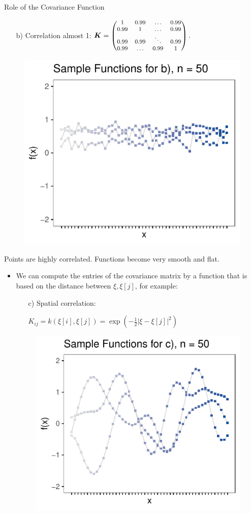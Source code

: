 \documentclass[11pt,compress,t,notes=noshow, xcolor=table]{beamer}
\begin{document}
\begin{vbframe}{Role of the Covariance Function}

\begin{enumerate}
  \item[b)] Correlation almost 1: $\bm{K} = \begin{footnotesize}\begin{pmatrix} 1 & 0.99 & \dots & 0.99 \\
  0.99 & 1 & \dots & 0.99 \\
  0.99 & 0.99 & \ddots & 0.99 \\
  0.99 & \dots & 0.99 & 1 \end{pmatrix}.\end{footnotesize}$
  \vspace{10pt}
\end{enumerate}

\begin{figure}\includegraphics[width=0.45\linewidth]{figure/discrete/example_extreme_50_2.pdf}
\end{figure}

Points are highly correlated. Functions become very smooth and flat.

\framebreak

\begin{itemize}
  \item We can compute the entries of the covariance matrix by a function that is based on the distance between $\xi, \xi[j]$, for example:

  \vspace*{0.2cm}
  \begin{enumerate}
    \item[c)] Spatial correlation: \begin{footnotesize}$K_{ij} = k(\xi[i], \xi[j]) = \exp\left(-\frac{1}{2}\left|\xi - \xi[j]\right|^2\right)$\end{footnotesize}
  \end{enumerate}

\begin{figure}
\includegraphics[width=0.45\linewidth]{figure/discrete/example_extreme_50_3.pdf}
\end{figure}


\end{itemize}
\end{vbframe}
\end{document}

